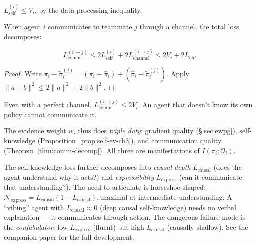 \begin{proposition}
\label{prop:self-ev-ch3}
$L_{\text{self}}^{(i)} \leq V_i$, by the data processing inequality.
\end{proposition}

When agent $i$ communicates to teammate $j$ through a channel, the total loss decomposes:

\begin{theorem}
\label{thm:comm-decomp}
\begin{equation}
    L_{\text{comm}}^{(i \to j)} \leq 2 L_{\text{self}}^{(i)} + 2 L_{\text{channel}}^{(i \to j)} \leq 2 V_i + 2 L_{\text{ch}}.
\end{equation}
\end{theorem}

\begin{proof}
Write $\pi_i - \tilde{\pi}_i^{(j)} = (\pi_i - \hat{\pi}_i) + (\hat{\pi}_i - \tilde{\pi}_i^{(j)})$. Apply $\|a+b\|^2 \leq 2\|a\|^2 + 2\|b\|^2$.
\end{proof}

\begin{corollary}
\label{cor:bottleneck-ch3}
Even with a perfect channel, $L_{\text{comm}}^{(i \to j)} \leq 2 V_i$. An agent that doesn't know its own policy cannot communicate it.
\end{corollary}

The evidence weight $w_i$ thus does \emph{triple duty}: gradient quality (\S\ref{sec:ewpg}), self-knowledge (Proposition~\ref{prop:self-ev-ch3}), and communication quality (Theorem~\ref{thm:comm-decomp}). All three are manifestations of $I(\pi_i; \mathcal{O}_i)$.

\begin{remark}
The self-knowledge loss further decomposes into \emph{causal depth} $L_{\text{causal}}$ (does the agent understand why it acts?) and \emph{expressibility} $L_{\text{express}}$ (can it communicate that understanding?). The need to articulate is horseshoe-shaped: $\mathcal{N}_{\text{express}} = L_{\text{causal}}(1 - L_{\text{causal}})$, maximal at intermediate understanding. A ``vibing'' agent with $L_{\text{causal}} \approx 0$ (deep causal self-knowledge) needs no verbal explanation --- it communicates through action. The dangerous failure mode is the \emph{confabulator}: low $L_{\text{express}}$ (fluent) but high $L_{\text{causal}}$ (causally shallow). See the companion paper for the full development.
\end{remark}

